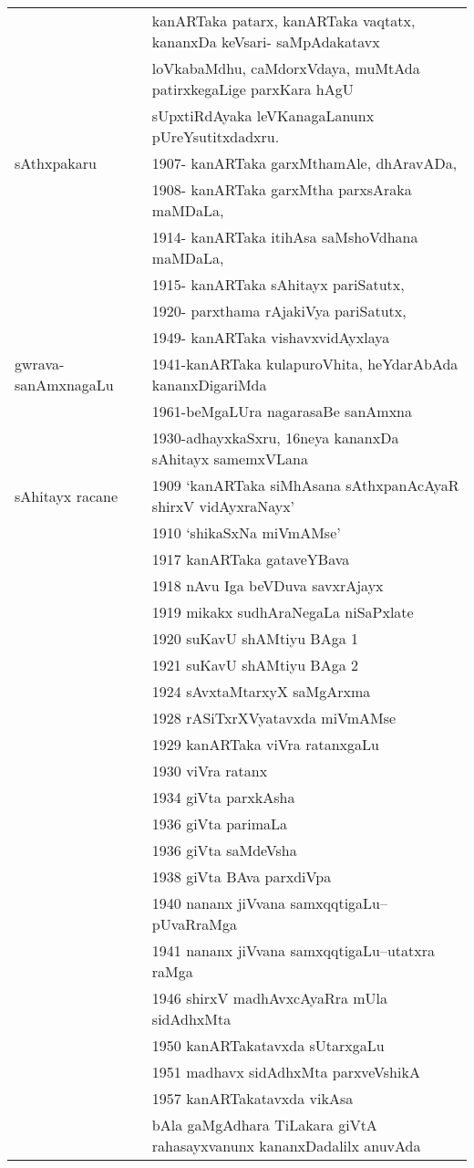\documentclass[11pt,a4size]{article}
\begin{document}
\begin{longtable}{@{}|l|p{11.5cm}|@{}}
& kanARTaka patarx, kanARTaka vaqtatx, kananxDa keVsari-\quad
  saMpAdakatavx\\[5pt]
& loVkabaMdhu, caMdorxVdaya, muMtAda patirxkegaLige parxKara hAgU\\
& sUpxtiRdAyaka leVKanagaLanunx pUreYsutitxdadxru.\\[3pt]
\hline
sAthxpakaru & 1907- kanARTaka garxMthamAle, dhAravADa,\\
            & 1908- kanARTaka garxMtha parxsAraka maMDaLa,\\
            & 1914- kanARTaka itihAsa saMshoVdhana maMDaLa,\\
            & 1915- kanARTaka sAhitayx pariSatutx,\\
            & 1920- parxthama rAjakiVya pariSatutx,\\
            & 1949- kanARTaka vishavxvidAyxlaya\\[3pt]
\hline
gwrava-sanAmxnagaLu & 1941-kanARTaka kulapuroVhita, heYdarAbAda
kananxDigariMda\\
& 1961-beMgaLUra nagarasaBe sanAmxna\\
& 1930-adhayxkaSxru, 16neya kananxDa sAhitayx samemxVLana\\[3pt]
\hline
sAhitayx racane & 1909 `kanARTaka siMhAsana sAthxpanAcAyaR shirxV
vidAyxraNayx'\index{vidAyxraNayx}
\\
& 1910 `shikaSxNa miVmAMse'\\
& 1917 kanARTaka gataveYBava\\
& 1918 nAvu Iga beVDuva savxrAjayx\\
& 1919 mikakx sudhAraNegaLa niSaPxlate\\
& 1920 suKavU shAMtiyu BAga 1\\
& 1921 suKavU shAMtiyu BAga 2\\
& 1924 sAvxtaMtarxyX saMgArxma\\
& 1928 rASiTxrXVyatavxda miVmAMse\\
& 1929 kanARTaka viVra ratanxgaLu\\
& 1930 viVra ratanx\\
& 1934 giVta parxkAsha\\
& 1936 giVta parimaLa\\
& 1936 giVta saMdeVsha\\
& 1938 giVta BAva parxdiVpa\\
& 1940 nananx jiVvana samxqqtigaLu--pUvaRraMga\\
& 1941 nananx jiVvana samxqqtigaLu--utatxra raMga\\
& 1946 shirxV madhAvxcAyaRra mUla sidAdhxMta\\
& 1950 kanARTakatavxda sUtarxgaLu\\
& 1951 madhavx sidAdhxMta parxveVshikA\\
& 1957 kanARTakatavxda vikAsa\\
& \phantom{1957} bAla gaMgAdhara TiLakara giVtA rahasayxvanunx
kananxDadalilx anuvAda\\[3pt]
\hline
\end{longtable}
\end{document}
